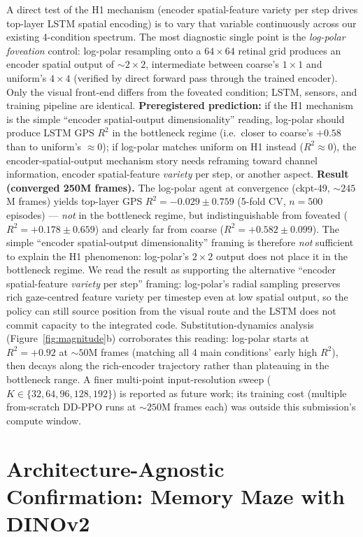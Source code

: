 \documentclass{article}
\begin{document}
A direct test of the H1 mechanism (encoder spatial-feature variety per step drives top-layer LSTM spatial encoding) is to vary that variable continuously across our existing 4-condition spectrum. The most diagnostic single point is the \emph{log-polar foveation} control: log-polar resampling onto a $64{\times}64$ retinal grid produces an encoder spatial output of $\sim 2{\times}2$, intermediate between coarse's $1{\times}1$ and uniform's $4{\times}4$ (verified by direct forward pass through the trained encoder). Only the visual front-end differs from the foveated condition; LSTM, sensors, and training pipeline are identical. \textbf{Preregistered prediction:} if the H1 mechanism is the simple ``encoder spatial-output dimensionality'' reading, log-polar should produce LSTM GPS $R^2$ in the bottleneck regime (i.e.\ closer to coarse's $+0.58$ than to uniform's $\approx 0$); if log-polar matches uniform on H1 instead ($R^2 \approx 0$), the encoder-spatial-output mechanism story needs reframing toward channel information, encoder spatial-feature \emph{variety} per step, or another aspect. \textbf{Result (converged 250M frames).} The log-polar agent at convergence (ckpt-49, $\sim 245$M frames) yields top-layer GPS $R^2 = -0.029 \pm 0.759$ (5-fold CV, $n=500$ episodes) --- \emph{not} in the bottleneck regime, but indistinguishable from foveated ($R^2 = +0.178 \pm 0.659$) and clearly far from coarse ($R^2 = +0.582 \pm 0.099$). The simple ``encoder spatial-output dimensionality'' framing is therefore \emph{not} sufficient to explain the H1 phenomenon: log-polar's $2{\times}2$ output does not place it in the bottleneck regime. We read the result as supporting the alternative ``encoder spatial-feature \emph{variety} per step'' framing: log-polar's radial sampling preserves rich gaze-centred feature variety per timestep even at low spatial output, so the policy can still source position from the visual route and the LSTM does not commit capacity to the integrated code. Substitution-dynamics analysis (Figure~\ref{fig:magnitude}b) corroborates this reading: log-polar starts at $R^2 = +0.92$ at $\sim 50$M frames (matching all 4 main conditions' early high $R^2$), then decays along the rich-encoder trajectory rather than plateauing in the bottleneck range. A finer multi-point input-resolution sweep ($K \in \{32, 64, 96, 128, 192\}$) is reported as future work; its training cost (multiple from-scratch DD-PPO runs at $\sim 250$M frames each) was outside this submission's compute window.


\section{Architecture-Agnostic Confirmation: Memory Maze with DINOv2}
\label{app:wmprobe}
\end{document}
